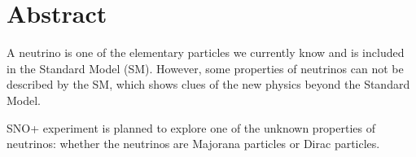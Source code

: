 \section{Abstract}

A neutrino is one of the elementary particles we currently know and is included in the Standard Model (SM). However, some properties of neutrinos can not be described by the SM, which shows clues of the new physics beyond the Standard Model.

SNO+ experiment is planned to explore one of the unknown properties of neutrinos: whether the neutrinos are Majorana particles or Dirac particles.



